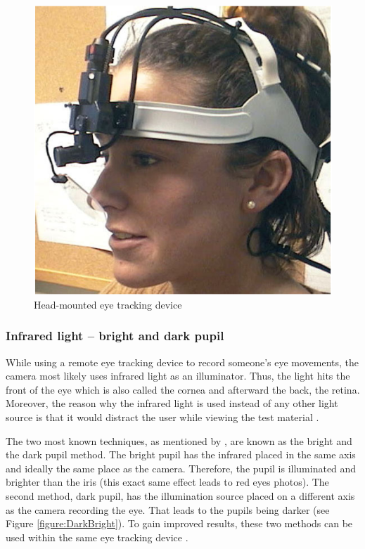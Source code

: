 \begin{figure}[!ht]
    \centering
    \includegraphics[width=1\linewidth]{images/headmounted_goldberg2002eye.png}
    \caption{
        Head-mounted eye tracking device  \autocite[12]{goldberg2002eye}
    }
    \label{figure:HeadMounted}
\end{figure}

\subsubsection{Infrared light -- bright and dark pupil}
While using a remote eye tracking device to record someone's eye movements, the camera most likely uses infrared light as an illuminator. Thus, the light hits the front of the eye which is also called the cornea and afterward the back, the retina. 
Moreover, the reason why the infrared light is used instead of any other light source is that it would distract the user while viewing the test material \autocite[]{poole2006eye, biedert2010eyebook}.

The two most known techniques, as mentioned by \textcite[]{goldberg2002eye}, are known as the bright and the dark pupil method. The bright pupil has the infrared placed in the same axis and ideally the same place as the camera. Therefore, the pupil is illuminated and brighter than the iris (this exact same effect leads to red eyes photos). The second method, dark pupil, has the illumination source placed on a different axis as the camera recording the eye. That leads to the pupils being darker (see Figure \ref{figure:DarkBright}). To gain improved results, these two methods can be used within the same eye tracking device \autocite[]{tobii2018dark, goldberg2002eye}. 

